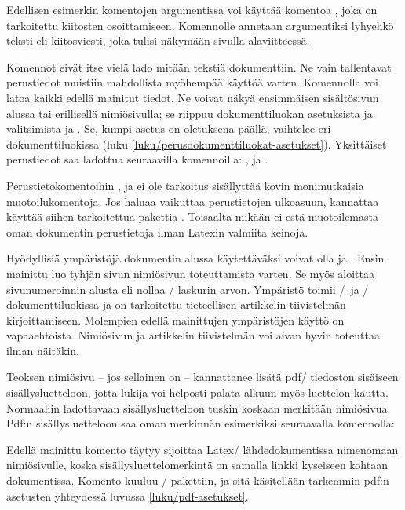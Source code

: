 \noindent
Edellisen esimerkin komentojen argumentissa voi käyttää komentoa
, joka on tarkoitettu kiitosten osoittamiseen.
Komennolle annetaan argumentiksi lyhyehkö teksti eli kiitosviesti, joka
tulisi näkymään sivulla alaviitteessä.

Komennot eivät itse vielä lado mitään tekstiä dokumenttiin. Ne vain
tallentavat perustiedot muistiin mahdollista myöhempää käyttöä varten.
Komennolla  voi latoa kaikki edellä mainitut tiedot.
Ne voivat näkyä ensimmäisen sisältösivun alussa tai erillisellä
nimiösivulla; se riippuu dokumenttiluokan asetuksista ja valitsimista
 ja . Se, kumpi asetus on oletuksena
päällä, vaihtelee eri dokumenttiluokissa (luku
\ref{luku/perusdokumenttiluokat-asetukset}). Yksittäiset perustiedot saa
ladottua seuraavilla komennoilla: ,
 ja .

Perustietokomentoihin ,  ja
 ei ole tarkoitus sisällyttää kovin monimutkaisia
muotoilukomentoja. Jos haluaa vaikuttaa perustietojen ulkoasuun,
kannattaa käyttää siihen tarkoitettua pakettia .
Toisaalta mikään ei estä muotoilemasta oman dokumentin perustietoja
ilman Latexin valmiita keinoja.

Hyödyllisiä ympäristöjä dokumentin alussa käytettäväksi voivat olla
 ja . Ensin mainittu luo
tyhjän sivun nimiösivun toteuttamista varten. Se myös aloittaa
sivunumeroinnin alusta eli nollaa \-/ laskurin arvon.
Ympäristö  toimii \-/\ ja
\-/ dokumenttiluokissa ja on tarkoitettu tieteellisen
artikkelin tiivistelmän kirjoittamiseen. Molempien edellä mainittujen
ympäristöjen käyttö on vapaaehtoista. Nimiösivun ja artikkelin
tiivistelmän voi aivan hyvin toteuttaa ilman näitäkin.

Teoksen nimiösivu -- jos sellainen on -- kannattanee lisätä pdf\-/
tiedoston sisäiseen sisällysluetteloon, jotta lukija voi helposti palata
alkuun myös luettelon kautta. Normaaliin ladottavaan sisällysluetteloon
tuskin koskaan merkitään nimiösivua. Pdf:n sisällysluetteloon saa oman
merkinnän esimerkiksi seuraavalla komennolla:

\begin{koodilohkosis}
\end{koodilohkosis}

\noindent
Edellä mainittu komento  täytyy sijoittaa Latex\-/
lähdedokumentissa nimenomaan nimiösivulle, koska
sisällysluettelomerkintä on samalla linkki kyseiseen kohtaan
dokumentissa. Komento kuuluu \-/ pakettiin, ja sitä
käsitellään tarkemmin pdf:n asetusten yhteydessä luvussa
\ref{luku/pdf-asetukset}.


